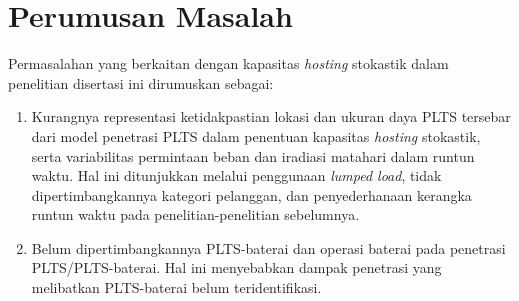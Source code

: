 

\section{Perumusan Masalah}
Permasalahan yang berkaitan dengan kapasitas \textit{hosting} stokastik dalam penelitian disertasi ini dirumuskan sebagai:
\begin{enumerate}
    \item Kurangnya representasi ketidakpastian lokasi dan ukuran daya PLTS tersebar dari model penetrasi PLTS dalam penentuan kapasitas \textit{hosting} stokastik, serta variabilitas permintaan beban dan iradiasi matahari dalam runtun waktu. Hal ini ditunjukkan melalui penggunaan \textit{lumped load}, tidak dipertimbangkannya kategori pelanggan, dan penyederhanaan kerangka runtun waktu pada penelitian-penelitian sebelumnya.
    \item Belum dipertimbangkannya PLTS-baterai dan operasi baterai pada penetrasi PLTS/PLTS-baterai. Hal ini menyebabkan dampak penetrasi yang melibatkan PLTS-baterai belum teridentifikasi.
\end{enumerate}

